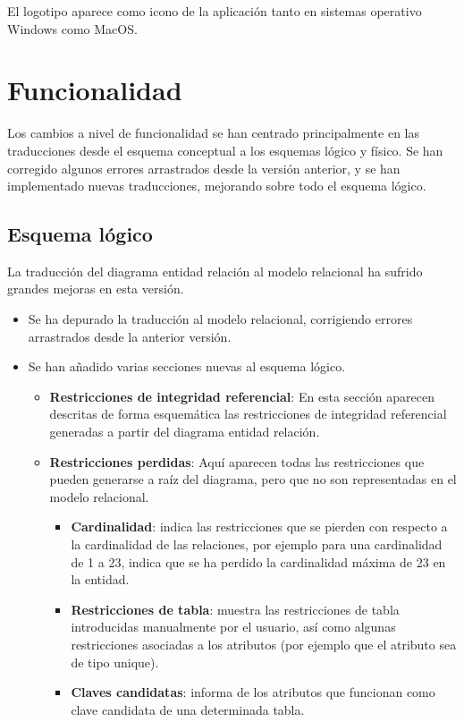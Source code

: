 El logotipo aparece como icono de la aplicación tanto en sistemas operativo Windows como MacOS.

\section{Funcionalidad}
Los cambios a nivel de funcionalidad se han centrado principalmente en las traducciones desde el esquema conceptual a los esquemas lógico y físico. Se han corregido algunos errores arrastrados desde la versión anterior, y se han implementado nuevas traducciones, mejorando sobre todo el esquema lógico.

\subsection{Esquema lógico}

La traducción del diagrama entidad relación al modelo relacional ha sufrido grandes mejoras en esta versión.
\begin{itemize}
    \item Se ha depurado la traducción al modelo relacional, corrigiendo errores arrastrados desde la anterior versión.
    \item Se han añadido varias secciones nuevas al esquema lógico.
    \begin{itemize}
        \item \textbf{Restricciones de integridad referencial}: En esta sección aparecen descritas de forma esquemática las restricciones de integridad referencial \cite{rir} generadas a partir del diagrama entidad relación.
        \item \textbf{Restricciones perdidas}: Aquí aparecen todas las restricciones que pueden generarse a raíz del diagrama, pero que no son representadas en el modelo relacional.
        \begin{itemize}
            \item \textbf{Cardinalidad}: indica las restricciones que se pierden con respecto a la cardinalidad de las relaciones, por ejemplo para una cardinalidad de 1 a 23, indica que se ha perdido la cardinalidad máxima de 23 en la entidad.
            \item \textbf{Restricciones de tabla}: muestra las restricciones de tabla introducidas manualmente por el usuario, así como algunas restricciones asociadas a los atributos (por ejemplo que el atributo sea de tipo unique).
            \item \textbf{Claves candidatas}: informa de los atributos que funcionan como clave candidata de una determinada tabla.
        \end{itemize}
    \end{itemize}
\end{itemize}
